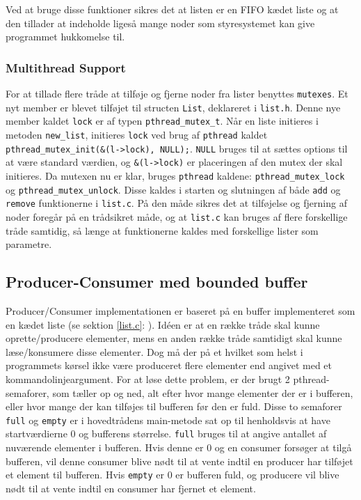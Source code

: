 Ved at bruge disse funktioner sikres det at listen er en FIFO kædet liste og at den tillader at indeholde ligeså mange noder som styresystemet kan give programmet hukkomelse til. 

\subsubsection{Multithread Support}
For at tillade flere tråde at tilføje og fjerne noder fra lister benyttes \texttt{mutexes}. Et nyt member er blevet tilføjet til structen \texttt{List}, deklareret i \texttt{list.h}. Denne nye member kaldet \texttt{lock} er af typen \texttt{pthread\_mutex\_t}. Når en liste initieres i metoden \texttt{new\_list}, initieres \texttt{lock} ved brug af \texttt{pthread} kaldet \texttt{pthread\_mutex\_init(\&(l->lock), NULL);}. \texttt{NULL} bruges til at sættes options til at være standard værdien, og \texttt{\&(l->lock)} er placeringen af den mutex der skal initieres. Da mutexen nu er klar, bruges \texttt{pthread} kaldene: \texttt{pthread\_mutex\_lock} og \texttt{pthread\_mutex\_unlock}. Disse kaldes i starten og slutningen af både \texttt{add} og \texttt{remove} funktionerne i \texttt{list.c}. På den måde sikres det at tilføjelse og fjerning af noder foregår på en trådsikret måde, og at \texttt{list.c} kan bruges af flere forskellige tråde samtidig, så længe at funktionerne kaldes med forskellige lister som parametre.

\subsection{Producer-Consumer med bounded buffer}
Producer/Consumer implementationen er baseret på en buffer implementeret som en kædet liste (se sektion \ref{list.c}: ). Idéen er at en række tråde skal kunne oprette/producere elementer, mens en anden række tråde samtidigt skal kunne læse/konsumere disse elementer. Dog må der på et hvilket som helst i programmets kørsel ikke være produceret flere elementer end angivet med et kommandolinjeargument. For at løse dette problem, er der brugt 2 pthread-semaforer, som tæller op og ned, alt efter hvor mange elementer der er i bufferen, eller hvor mange der kan tilføjes til bufferen før den er fuld. Disse to semaforer \texttt{full} og \texttt{empty} er i hovedtrådens main-metode sat op til henholdsvis at have startværdierne 0 og bufferens størrelse. \texttt{full} bruges til at angive antallet af nuværende elementer i bufferen. Hvis denne er 0 og en consumer forsøger at tilgå bufferen, vil denne consumer blive nødt til at vente indtil en producer har tilføjet et element til bufferen. Hvis \texttt{empty} er 0 er bufferen fuld, og producere vil blive nødt til at vente indtil en consumer har fjernet et element.\\


